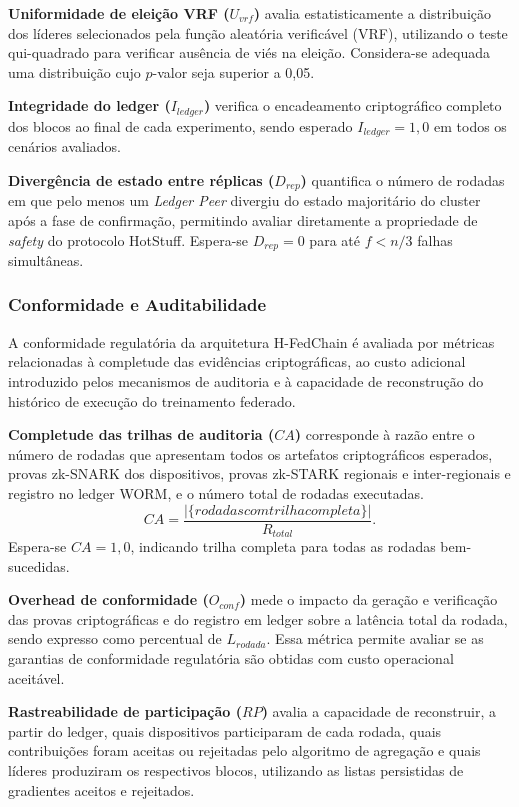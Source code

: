 \documentclass[12pt]{article}
\begin{document}
\textbf{Uniformidade de eleição VRF ($U_{vrf}$)} avalia estatisticamente a distribuição dos líderes selecionados pela função aleatória verificável (VRF), utilizando o teste qui-quadrado para verificar ausência de viés na eleição. Considera-se adequada uma distribuição cujo $p$-valor seja superior a 0,05.

\textbf{Integridade do ledger ($I_{ledger}$)} verifica o encadeamento criptográfico completo dos blocos ao final de cada experimento, sendo esperado $I_{ledger} = 1,0$ em todos os cenários avaliados.

\textbf{Divergência de estado entre réplicas ($D_{rep}$)} quantifica o número de rodadas em que pelo menos um \textit{Ledger Peer} divergiu do estado majoritário do cluster após a fase de confirmação, permitindo avaliar diretamente a propriedade de \textit{safety} do protocolo HotStuff. Espera-se $D_{rep} = 0$ para até $f < n/3$ falhas simultâneas.

\subsubsection{Conformidade e Auditabilidade}

A conformidade regulatória da arquitetura H-FedChain é avaliada por métricas relacionadas à completude das evidências criptográficas, ao custo adicional introduzido pelos mecanismos de auditoria e à capacidade de reconstrução do histórico de execução do treinamento federado.

\textbf{Completude das trilhas de auditoria ($CA$)} corresponde à razão entre o número de rodadas que apresentam todos os artefatos criptográficos esperados, provas zk-SNARK dos dispositivos, provas zk-STARK regionais e inter-regionais e registro no ledger WORM, e o número total de rodadas executadas.
\[
CA=\frac{|\{{rodadas com trilha completa}\}|}{R_{{total}}}.
\]
Espera-se $CA = 1,0$, indicando trilha completa para todas as rodadas bem-sucedidas.

\textbf{Overhead de conformidade ($O_{conf}$)} mede o impacto da geração e verificação das provas criptográficas e do registro em ledger sobre a latência total da rodada, sendo expresso como percentual de $L_{rodada}$. Essa métrica permite avaliar se as garantias de conformidade regulatória são obtidas com custo operacional aceitável.

\textbf{Rastreabilidade de participação ($RP$)} avalia a capacidade de reconstruir, a partir do ledger, quais dispositivos participaram de cada rodada, quais contribuições foram aceitas ou rejeitadas pelo algoritmo de agregação e quais líderes produziram os respectivos blocos, utilizando as listas persistidas de gradientes aceitos e rejeitados.
\end{document}
